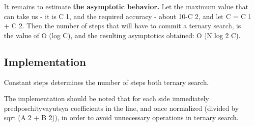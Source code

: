 It remains to estimate \textbf{the asymptotic behavior.} Let the maximum value that can take us - it is C 1, and the required accuracy - about 10-C 2, and let C = C 1 + C 2. Then the number of steps that will have to commit a ternary search, is the value of O (log C), and the resulting asymptotics obtained: O (N log 2 C).

\subsection{ Implementation }
Constant steps determines the number of steps both ternary search.

The implementation should be noted that for each side immediately predposchityvayutsya coefficients in the line, and once normalized (divided by sqrt (A 2 + B 2)), in order to avoid unnecessary operations in ternary search.


